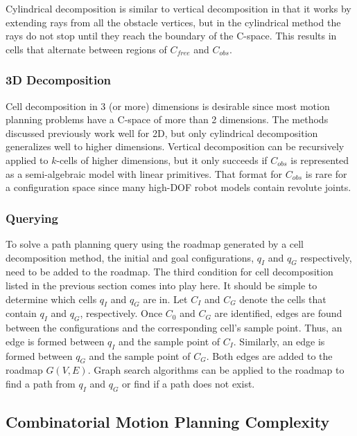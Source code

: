 \documentclass[10pt,conference]{ieeeconf}
\begin{document}
Cylindrical decomposition \cite{something} is similar to vertical decomposition in that it works by extending rays from all the obstacle vertices, but in the cylindrical method the rays do not stop until they reach the boundary of the C-space. This results in cells that alternate between regions of $C_{free}$ and $C_{obs}$. 

\subsubsection{3D Decomposition}

Cell decomposition in 3 (or more) dimensions is desirable since most motion planning problems have a C-space of more than 2 dimensions. The methods discussed previously work well for 2D, but only cylindrical decomposition generalizes well to higher dimensions. Vertical decomposition can be recursively applied to $k$-cells of higher dimensions, but it only succeeds if $C_{obs}$ is represented as a semi-algebraic model with linear primitives. That format for $C_{obs}$ is rare for a configuration space since many high-DOF robot models contain revolute joints.

\subsubsection{Querying}

To solve a path planning query using the roadmap generated by a cell decomposition method, the initial and goal configurations, $q_I$ and $q_G$ respectively, need to be added to the roadmap. The third condition for cell decomposition listed in the previous section comes into play here. It should be simple to determine which cells $q_I$ and $q_G$ are in. Let $C_I$ and $C_G$ denote the cells that contain $q_I$ and $q_G$, respectively. Once $C_0$ and $C_G$ are identified, edges are found between the configurations and the corresponding cell's sample point. Thus, an edge is formed between $q_I$ and the sample point of $C_I$. Similarly, an edge is formed between $q_G$ and the sample point of $C_G$. Both edges are added to the roadmap $G(V,E)$. Graph search algorithms can be applied to the roadmap to find a path from $q_I$ and $q_G$ or find if a path does not exist.


\subsection{Combinatorial Motion Planning Complexity}
\end{document}
